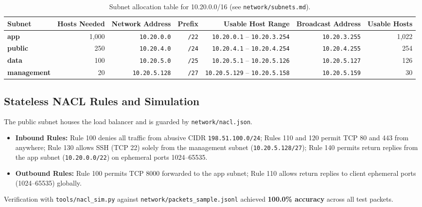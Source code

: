 \documentclass[10pt,a4paper]{article}
\begin{document}
\begin{table}[h!]
\centering
\small
\begin{tabular}{lrrrrrr}
\toprule
\textbf{Subnet} & \textbf{Hosts Needed} & \textbf{Network Address} & \textbf{Prefix} & \textbf{Usable Host Range} & \textbf{Broadcast Address} & \textbf{Usable Hosts} \\
\midrule
\textbf{app} & 1,000 & \texttt{10.20.0.0} & \texttt{/22} & \texttt{10.20.0.1} -- \texttt{10.20.3.254} & \texttt{10.20.3.255} & 1,022 \\
\textbf{public} & 250 & \texttt{10.20.4.0} & \texttt{/24} & \texttt{10.20.4.1} -- \texttt{10.20.4.254} & \texttt{10.20.4.255} & 254 \\
\textbf{data} & 100 & \texttt{10.20.5.0} & \texttt{/25} & \texttt{10.20.5.1} -- \texttt{10.20.5.126} & \texttt{10.20.5.127} & 126 \\
\textbf{management} & 20 & \texttt{10.20.5.128} & \texttt{/27} & \texttt{10.20.5.129} -- \texttt{10.20.5.158} & \texttt{10.20.5.159} & 30 \\
\bottomrule
\end{tabular}
\caption{Subnet allocation table for 10.20.0.0/16 (see \texttt{network/subnets.md}).}
\label{tab:subnets}
\end{table}

\subsection{Stateless NACL Rules and Simulation}
The public subnet houses the load balancer and is guarded by \texttt{network/nacl.json}.
\begin{itemize}
    \item \textbf{Inbound Rules:} Rule 100 denies all traffic from abusive CIDR \texttt{198.51.100.0/24}; Rules 110 and 120 permit TCP 80 and 443 from anywhere; Rule 130 allows SSH (TCP 22) solely from the management subnet (\texttt{10.20.5.128/27}); Rule 140 permits return replies from the app subnet (\texttt{10.20.0.0/22}) on ephemeral ports 1024--65535.
    \item \textbf{Outbound Rules:} Rule 100 permits TCP 8000 forwarded to the app subnet; Rule 110 allows return replies to client ephemeral ports (1024--65535) globally.
\end{itemize}
Verification with \texttt{tools/nacl\_sim.py} against \texttt{network/packets\_sample.jsonl} achieved \textbf{100.0\% accuracy} across all test packets.
\end{document}
